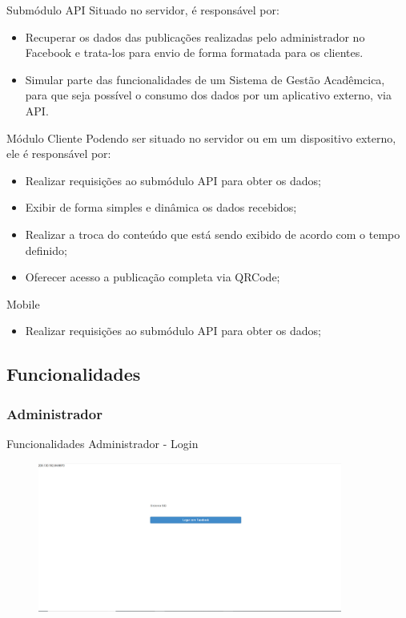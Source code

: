 \documentclass{aula-ifb}
\begin{document}
\begin{frame}{Submódulo API}
Situado no servidor, é responsável por:
\begin{itemize}
   \item Recuperar os dados das publicações realizadas pelo administrador no Facebook e trata-los para envio de forma formatada para os clientes. 
   \item Simular parte das funcionalidades de um Sistema de Gestão Acadêmcica, para que seja possível o consumo dos dados por um aplicativo externo, via API.
\end{itemize}
\end{frame}

\begin{frame}{Módulo Cliente}
Podendo ser situado no servidor ou em um dispositivo externo, ele é responsável por:
\begin{itemize}
   \item Realizar requisições ao submódulo API para obter os dados;
   \item Exibir de forma simples e dinâmica os dados recebidos;
   \item Realizar a troca do conteúdo que está sendo exibido de acordo com o tempo definido;
   \item Oferecer acesso a publicação completa via QRCode;
\end{itemize}
\end{frame}

\begin{frame}{Mobile}
\begin{itemize}
   \item Realizar requisições ao submódulo API para obter os dados;
\end{itemize}
\end{frame}

\subsection{Funcionalidades}
\subsubsection{Administrador}
\begin{frame}{Funcionalidades Administrador - Login}
\begin{figure}[h]
\includegraphics[width=10cm]{figuras/funcionalidadelogin.png}
\label{fig:facebookgraph}
\end{figure}
\end{frame}
\end{document}
